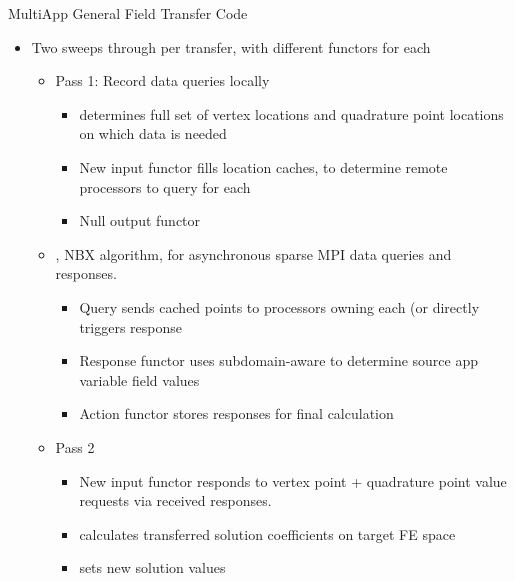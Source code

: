 \begin{frame}{MultiApp General Field Transfer Code}
\begin{itemize}
  \item Two sweeps through  per transfer, with
    different functors for each
  \begin{itemize}
    \item {} Pass 1: Record data queries locally
    \begin{itemize}
      \item {} determines full set of vertex
        locations and quadrature point locations on which data is
        needed
      \item New  input functor fills location
        caches, to determine remote processors to query for each
      \item Null output functor
    \end{itemize}
    \item {}, NBX algorithm,
      for asynchronous sparse MPI data queries and responses.
    \begin{itemize}
      \item Query sends cached points to processors owning
        each (or directly triggers response 
      \item Response functor  uses
        subdomain-aware  to determine source app
        variable field values
      \item Action functor  stores
        responses for final calculation
    \end{itemize}
    \item {} Pass 2
    \begin{itemize}
      \item New  input functor responds to vertex
        point + quadrature point value requests via received
        responses.
      \item {} calculates transferred solution
        coefficients on target FE space
      \item {} sets new solution values
    \end{itemize}
  \end{itemize}
\end{itemize}
\end{frame}
